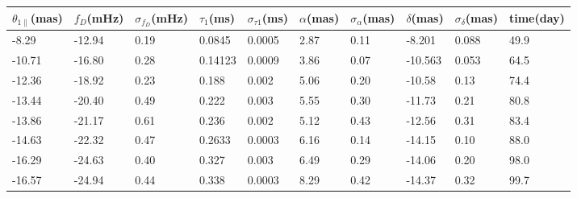 \documentclass[useAMS,usenatbib]{mn2e}
\begin{document}
\begin{table}
\centering
\begin{tabular}{llllllllll}
\hline
$\theta_{1\parallel}$(mas) &$f_D$(mHz) & $\sigma_{f_D}$(mHz) & $\tau_1$(ms) & $\sigma_{\tau1}$(ms) & $\alpha$(mas) & $\sigma_{\alpha}$(mas) & $\delta$(mas) & $\sigma_{\delta}$(mas) & time(day)\\
\hline
 -8.29   & -12.94                            & 0.19      & 0.0845  & 0.0005          & 2.87    & 0.11                                     & -8.201     & 0.088      & 49.9                                \\

-10.71   &-16.80                             & 0.28      & 0.14123 & 0.0009         & 3.86    & 0.07                                     & -10.563    & 0.053      &64.5                                \\

-12.36   &-18.92                            & 0.23      & 0.188   & 0.002           & 5.06    & 0.20                                      & -10.58    & 0.13      &74.4                        \\

-13.44 & -20.40                             & 0.49      & 0.222   & 0.003           & 5.55    & 0.30                                      & -11.73    & 0.21      &80.8                                \\

-13.86 &-21.17                            & 0.61      & 0.236   & 0.002           & 5.12    & 0.43                                     & -12.56    & 0.31      &83.4                                \\

-14.63   &-22.32                            & 0.47      & 0.2633  & 0.0003          & 6.16    & 0.14                                     & -14.15    & 0.10       &88.0                                \\

-16.29   &-24.63                            & 0.40       & 0.327  & 0.003          & 6.49    & 0.29                                     & -14.06    & 0.20       &98.0                                \\

-16.57  &-24.94                            & 0.44      & 0.338 & 0.0003         & 8.29    & 0.42                                     & -14.37    & 0.32      &99.7                                \\


\end{tabular}
\end{table}
\end{document}

